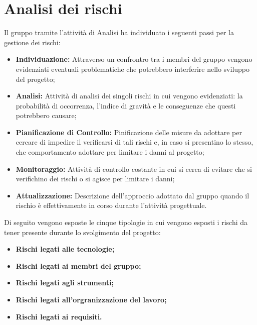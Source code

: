\section{Analisi dei rischi}

Il gruppo \Gruppo tramite l'attività di Analisi ha individuato i seguenti passi per la gestione dei rischi:

\begin{itemize}

    \item{\textbf{Individuazione:}} Attraverso un confrontro tra i membri del gruppo vengono evidenziati eventuali problematiche che potrebbero interferire nello sviluppo del progetto;

    \item{\textbf{Analisi:}} Attività di analisi dei singoli rischi in cui vengono evidenziati: la probabilità di occorrenza, l'indice di gravità e le conseguenze che  questi potrebbero causare;

    \item{\textbf{Pianificazione di Controllo:}} Pinificazione delle misure da adottare per cercare di impedire il verificarsi di tali rischi e, in caso si presentino lo stesso, che comportamento adottare per limitare i danni al progetto;

    \item{\textbf{Monitoraggio:}} Attività di controllo costante in cui si cerca di evitare che si verifichino dei rischi o si agisce per limitare i danni;

    \item{\textbf{Attualizzazione:}} Descrizione dell'approccio adottato dal gruppo quando il rischio è effettivamente in corso durante l'attività progettuale.
\end{itemize}

Di seguito vengono esposte le cinque tipologie in cui vengono esposti i rischi da tener presente durante lo svolgimento del progetto:

\begin{itemize}
    \item{\textbf{Rischi legati alle tecnologie;}}
    \item {\textbf{Rischi legati ai membri del gruppo;}}
    \item {\textbf{Rischi legati agli strumenti;}}
    \item {\textbf{Rischi legati all'orgranizzazione del lavoro;}}
    \item {\textbf{Rischi legati ai requisiti.}}
\end{itemize}

\renewcommand{\arraystretch}{1.5}

\newpage


\newpage


\newpage


\newpage


\newpage
